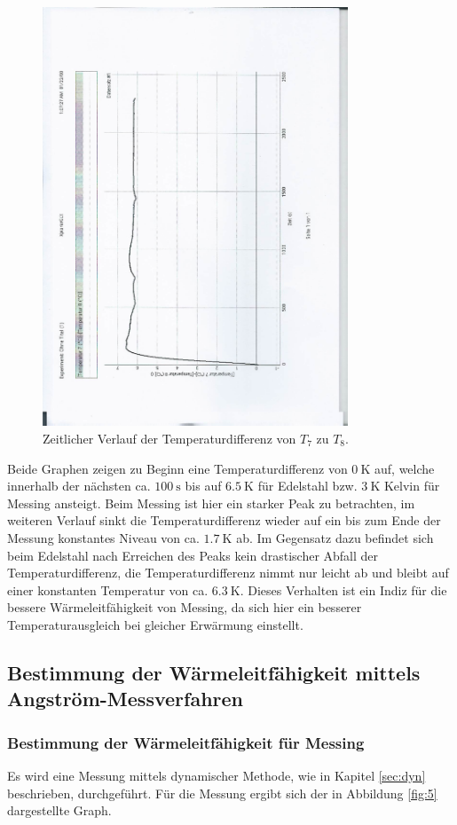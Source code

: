 \begin{figure}[H]
  \centering
  \includegraphics[height=12.5cm, angle=270]{scan-5.jpg}
  \caption{Zeitlicher Verlauf der Temperaturdifferenz von $T_7$ zu $T_8$.}
  \label{fig:4}
\end{figure}

Beide Graphen zeigen zu Beginn eine Temperaturdifferenz von $\SI{0}{\kelvin}$ auf, welche innerhalb der nächsten ca. $\SI{100}{\second}$ bis auf $\SI{6.5}{\kelvin}$ für Edelstahl bzw. $\SI{3}{\kelvin}$ Kelvin für Messing ansteigt.
Beim Messing ist hier ein starker Peak zu betrachten, im weiteren Verlauf sinkt die Temperaturdifferenz wieder auf ein bis zum Ende der Messung konstantes Niveau von ca. $\SI{1.7}{\kelvin}$ ab.
Im Gegensatz dazu befindet sich beim Edelstahl nach Erreichen des Peaks kein drastischer Abfall der Temperaturdifferenz, die Temperaturdifferenz nimmt nur leicht ab und bleibt auf einer konstanten Temperatur von ca. $\SI{6.3}{\kelvin}$.
Dieses Verhalten ist ein Indiz für die bessere Wärmeleitfähigkeit von Messing, da sich hier ein besserer Temperaturausgleich bei gleicher Erwärmung einstellt.

\subsection{Bestimmung der Wärmeleitfähigkeit mittels Angström-Messverfahren}
\subsubsection{Bestimmung der Wärmeleitfähigkeit für Messing}
Es wird eine Messung mittels dynamischer Methode, wie in Kapitel \ref{sec:dyn} beschrieben, durchgeführt.
Für die Messung ergibt sich der in Abbildung \ref{fig:5} dargestellte Graph.

